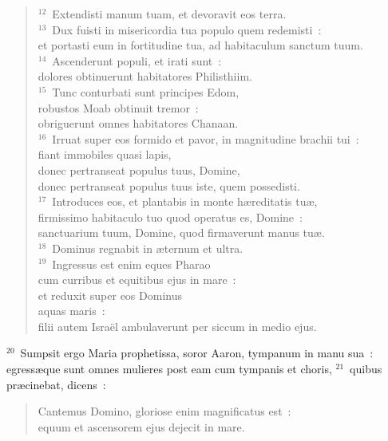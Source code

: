 \begin{flushleft}
\begin{verse}
${}^{12}$~Extendisti manum tuam, et devoravit eos terra.\\
${}^{13}$~Dux fuisti in misericordia tua populo quem redemisti~:\\ et portasti eum in fortitudine tua, ad habitaculum sanctum tuum.\\
${}^{14}$~Ascenderunt populi, et irati sunt~:\\ dolores obtinuerunt habitatores Philisthiim.\\
${}^{15}$~Tunc conturbati sunt principes Edom,\\ robustos Moab obtinuit tremor~:\\ obriguerunt omnes habitatores Chanaan.\\
${}^{16}$~Irruat super eos formido et pavor, in magnitudine brachii tui~:\\ fiant immobiles quasi lapis,\\ donec pertranseat populus tuus, Domine,\\ donec pertranseat populus tuus iste, quem possedisti.\\
${}^{17}$~Introduces eos, et plantabis in monte h\ae reditatis tu\ae ,\\ firmissimo habitaculo tuo quod operatus es, Domine~:\\ sanctuarium tuum, Domine, quod firmaverunt manus tu\ae .\\
${}^{18}$~Dominus regnabit in \ae ternum et ultra.\\
${}^{19}$~Ingressus est enim eques Pharao\\ cum curribus et equitibus ejus in mare~:\\ et reduxit super eos Dominus\\ aquas maris~:\\ filii autem Isra\"el ambulaverunt per siccum in medio ejus.\end{verse}\end{flushleft}


${}^{20}$~Sumpsit ergo Maria prophetissa, soror Aaron, tympanum in manu sua~: egress\ae que sunt omnes mulieres post eam cum tympanis et choris,
${}^{21}$~quibus pr\ae cinebat, dicens~: \begin{flushleft}\begin{verse}Cantemus Domino, gloriose enim magnificatus est~:\\ equum et ascensorem ejus dejecit in mare.\end{verse}\end{flushleft}


